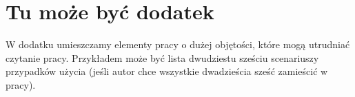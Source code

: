 \chapter{Tu może być dodatek}\label{Dod1}

W dodatku umieszczamy elementy pracy o dużej objętości, które mogą utrudniać czytanie pracy. Przykładem może być lista dwudziestu sześciu scenariuszy przypadków użycia (jeśli autor chce wszystkie dwadzieścia sześć zamieścić w pracy). 

\lipsum[9-11]